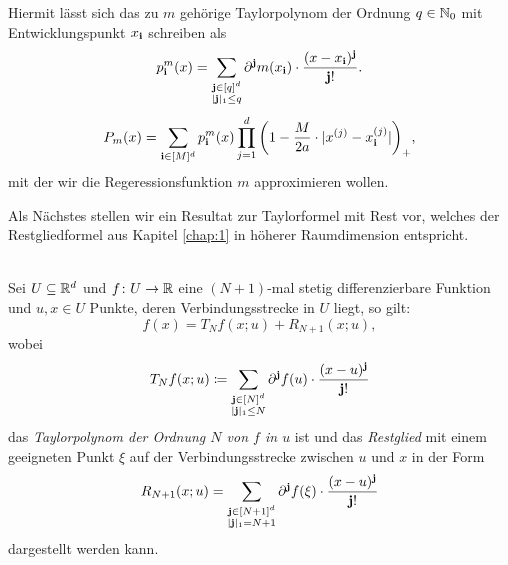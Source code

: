 Hiermit lässt sich das zu $m$ gehörige Taylorpolynom der Ordnung $q \in \mathbb{N}_0$ mit Entwicklungspunkt $x_{\mathbf{i}}$ schreiben als
$$p_{\mathbf{i}}^m(x) = \sum_{\substack{\mathbf{j} \in [q]^d \\|\mathbf{j}|_1 \leq q}} \partial^{\mathbf{j}}m(x_{\mathbf{i}}) \cdot \frac{(x - x_{\mathbf{i}})^{\mathbf{j}}}{\mathbf{j}!}.$$
\begin{equation}
\label{konvexkomb}
P_m(x) = \sum_{\mathbf{i} \in [M]^d} p_{\mathbf{i}}^m(x) \prod_{j = 1}^{d} \bigg(1 - \frac{M}{2a} \cdot |x^{(j)} - x_{\mathbf{i}}^{(j)}|\bigg)_+,
\end{equation}
mit der wir die Regeressionsfunktion $m$ approximieren wollen.

Als Nächstes stellen wir ein Resultat zur Taylorformel mit Rest vor, welches der Restgliedformel aus Kapitel \ref{chap:1} in höherer Raumdimension entspricht.
\begin{lem}
\label{lem:lagrangehoch} \ \\
Sei $U \subseteq \mathbb{R}^d$ und $f\colon U \to \mathbb{R}$ eine $(N + 1)$-mal stetig differenzierbare Funktion und $u, x \in U$ Punkte, deren Verbindungsstrecke in $U$ liegt, so gilt:
$$ f(x) = T_Nf(x;u) + R_{N + 1}(x;u),$$
wobei
$$
T_Nf(x;u) \coloneqq \sum_{\substack{\mathbf{j} \in [N]^d \\ |\mathbf{j}|_1 \leq N}}  \partial^{\mathbf{j}}f(u) \cdot \frac{ (x - u)^{\mathbf{j}} }{\mathbf{j}!}
$$
das \emph{Taylorpolynom der Ordnung $N$ von $f$ in $u$} ist und das \emph{Restglied} mit einem geeigneten Punkt $\xi$ auf der Verbindungsstrecke zwischen $u$ und $x$ in der Form 
$$ R_{N + 1}(x;u) = \sum_{\substack{ \mathbf{j} \in [N + 1]^d \\|\mathbf{j}|_1 = N + 1}} \partial^{\mathbf{j}}f(\xi) \cdot \frac{ (x - u)^{\mathbf{j}} }{\mathbf{j}!}$$
dargestellt werden kann.
\end{lem}

